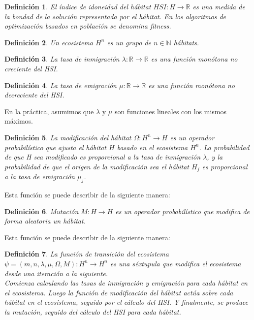 \documentclass{article}
\newtheorem{mydef}{Definición}
\begin{document}
\begin{mydef}
    El índice de idoneidad del hábitat $HSI: H \rightarrow \mathbb{R}$ es una medida de la bondad de la solución representada por el hábitat. En los algoritmos de optimización basados en población se denomina fitness.
\end{mydef}

\begin{mydef}
    Un ecosistema $H^{n}$ es un grupo de $n \in \mathbb{N}$ hábitats.
\end{mydef}

\begin{mydef}
    La tasa de inmigración $\lambda: \mathbb{R} \rightarrow \mathbb{R}$ es una función monótona no creciente del HSI.
\end{mydef}

\begin{mydef}
    La tasa de emigración $\mu: \mathbb{R} \rightarrow \mathbb{R}$ es una función monótona no decreciente del HSI.
\end{mydef}

En la práctica, asumimos que $\lambda$ y $\mu$ son funciones lineales con los mismos máximos.

\begin{mydef}
    La modificación del hábitat $\Omega: H^{n} \rightarrow H$ es un operador probabilístico que ajusta el hábitat $H$ basado en el 
    ecosistema $H^{n}$. 
    La probabilidad de que H sea modificado es proporcional a la tasa de inmigración $\lambda$, y la probabilidad de que el origen de 
    la modificación sea el hábitat $H_{j}$ es proporcional a la tasa de emigración $\mu_j$. 
\end{mydef}

    Esta función se puede describir de la siguiente manera:

\begin{mydef}
    Mutación $M: H \rightarrow H$ es un operador probabilístico que modifica de forma aleatoria un hábitat.
\end{mydef}

    Esta función se puede describir de la siguiente manera:

\begin{mydef}
    La función de transición del ecosistema $\psi = (m,n,\lambda,\mu,\Omega,M): H^{n} \rightarrow H^{n}$ es una 
    séxtupula que modifica el ecosistema desde una iteración a la siguiente. \\
    Comienza calculando las tasas de inmigración y emigración para cada hábitat en el ecosistema. Luego la función de modificación del hábitat 
    actúa sobre cada hábitat en el ecosistema, seguido por el cálculo del HSI. Y finalmente, se produce la mutación, seguido del cálculo del HSI 
    para cada hábitat.
\end{mydef}
\end{document}
